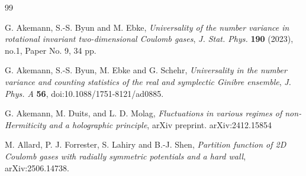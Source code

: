 \documentclass[reqno]{amsart}
\newcommand{\1}{\mathds{1}}
\numberwithin{equation}{section}
\theoremstyle{definition}
\begin{document}
\begin{thebibliography}{99}

 G. Akemann, S.-S. Byun and M. Ebke, \emph{Universality of the number variance in rotational invariant two-dimensional Coulomb gases}, \textit{J. Stat. Phys.} \textbf{190} (2023), no.1, Paper No. 9, 34 pp.

 G. Akemann, S.-S. Byun, M. Ebke and G. Schehr, \emph{Universality in the number variance and counting statistics of the real and symplectic Ginibre ensemble}, \textit{J. Phys. A} \textbf{56}, doi:10.1088/1751-8121/ad0885.

G. Akemann, M. Duits, and L. D. Molag, \emph{Fluctuations in various regimes of non-Hermiticity and a holographic principle}, arXiv preprint. arXiv:2412.15854




M. Allard, P. J. Forrester, S. Lahiry and B.-J. Shen, \emph{Partition function of 2D Coulomb gases with radially symmetric potentials and a hard wall}, arXiv:2506.14738.


\end{thebibliography}
\end{document}

